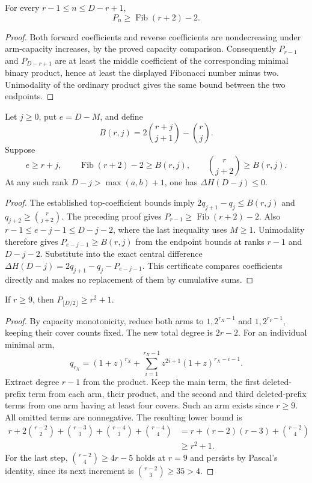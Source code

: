 \begin{corollary}
For every $r-1\le n\le D-r+1$,
\[
                  P_n\ge\operatorname{Fib}(r+2)-2.
\]
\end{corollary}
\begin{proof}
Both forward coefficients and reverse coefficients are nondecreasing
under arm-capacity increases, by the proved capacity comparison.
Consequently $P_{r-1}$ and $P_{D-r+1}$ are at least the middle
coefficient of the corresponding minimal binary product, hence at
least the displayed Fibonacci number minus two. Unimodality of the
ordinary product gives the same bound between the two endpoints.
\end{proof}

\begin{corollary}
Let $j\ge0$, put $e=D-M$, and define
\[
 B(r,j)=2\binom{r+j}{j+1}-\binom rj.
\]
Suppose
\[
 e\ge r+j,\qquad
 \operatorname{Fib}(r+2)-2\ge B(r,j),\qquad
 \binom r{j+2}\ge B(r,j).
\]
At any such rank $D-j>\max(a,b)+1$, one has
$\Delta H(D-j)\le0$.
\end{corollary}
\begin{proof}
The established top-coefficient bounds imply
$2q_{j+1}-q_j\le B(r,j)$ and $q_{j+2}\ge\binom r{j+2}$.
The preceding proof gives $P_{r-1}\ge\operatorname{Fib}(r+2)-2$.
Also $r-1\le e-j-1\le D-j-2$, where the last inequality uses
$M\ge1$. Unimodality therefore gives
$P_{e-j-1}\ge B(r,j)$ from the endpoint bounds at ranks
$r-1$ and $D-j-2$. Substitute into the exact central difference
$\Delta H(D-j)=2q_{j+1}-q_j-P_{e-j-1}$.
This certificate compares coefficients directly and makes no
replacement of them by cumulative sums.
\end{proof}

\begin{lemma}
If $r\ge9$, then $P_{\lfloor D/2\rfloor}\ge r^2+1$.
\end{lemma}
\begin{proof}
By capacity monotonicity, reduce both arms to
$1,2^{r_X-1}$ and $1,2^{r_Y-1}$, keeping their cover counts fixed.
The new total degree is $2r-2$. For an individual minimal arm,
\[
 q_{r_X}=(1+z)^{r_X}
       +\sum_{i=1}^{r_X-1}z^{2i+1}(1+z)^{r_X-i-1}.
\]
Extract degree $r-1$ from the product. Keep the main term, the first
deleted-prefix term from each arm, their product, and the second and
third deleted-prefix terms from one arm having at least four covers.
Such an arm exists since $r\ge9$. All omitted terms are nonnegative.
The resulting lower bound is
\begin{align*}
 r+2\binom{r-2}{2}+\binom{r-3}{3}
       +\binom{r-4}{3}+\binom{r-4}{4}
 &=r+(r-2)(r-3)+\binom{r-2}{4}\\
 &\ge r^2+1.
\end{align*}
For the last step, $\binom{r-2}{4}\ge4r-5$ holds at $r=9$ and
persists by Pascal's identity, since its next increment is
$\binom{r-2}{3}\ge35>4$.
\end{proof}

